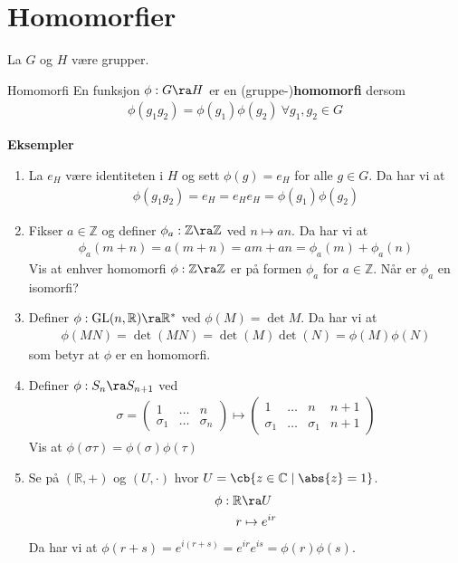 \section{Homomorfier}
La $G$ og $H$ være grupper.

\begin{definition}{Homomorfi}{}
	En funksjon $\phi:G\ra H$ er en (gruppe-)\textbf{homomorfi} dersom
	\begin{align}
		\phi(g_1g_2)=\phi(g_1)\phi(g_2)\ \forall g_1,g_2\in G
	\end{align}
\end{definition}

\textbf{Eksempler}
\begin{enumerate}
	\item La $e_H$ være identiteten i $H$ og sett $\phi(g)=e_H$ for alle $g\in G$. Da har vi at
	      \begin{align}
		      \phi(g_1g_2)=e_H=e_He_H=\phi(g_1)\phi(g_2)
	      \end{align}
	\item Fikser $a\in \mathbb{Z}$ og definer $\phi_a: \mathbb{Z}\ra \mathbb{Z}$ ved
	      $n \mapsto an$. Da har vi at
	      \begin{align}
		      \phi_a(m+n)=a(m+n)=am+an=\phi_a(m)+\phi_a(n)
	      \end{align}
	      Vis at enhver homomorfi $\phi: \mathbb{Z}\ra \mathbb{Z}$ er på formen $\phi_a$ for
	      $a\in \mathbb{Z}$. Når er $\phi_a$ en isomorfi?
	\item Definer $\phi: \text{GL}(n,\mathbb{R})\ra \mathbb{R}^*$ ved $\phi(M)=\det M$. Da har
	      vi at
	      \begin{align}
		      \phi(MN)=\det(MN)=\det(M)\det(N)=\phi(M)\phi(N)
	      \end{align}
	      som betyr at $\phi$ er en homomorfi.
	\item Definer $\phi:S_n\ra S_{n+1}$ ved
	      \begin{align}
		      \sigma=\begin{pmatrix}1 & \dots & n \\ \sigma_1 & \dots & \sigma_n\end{pmatrix}
		      \mapsto
		      \begin{pmatrix}1 & \dots & n & n+1 \\ \sigma_1 & \dots & \sigma_1 & n+1\end{pmatrix}
	      \end{align}
	      Vis at $\phi(\sigma\tau)=\phi(\sigma)\phi(\tau)$
	\item Se på $(\mathbb{R}, +)$ og $(U, \cdot)$ hvor $U=\cb{z\in\mathbb{C}\mid\abs{z}=1}$.
	      \begin{align}
		      \phi: \mathbb{R} & \ra U          \\
		      r                & \mapsto e^{ir}
	      \end{align}
	      Da har vi at $\phi(r+s)=e^{i(r+s)}=e^{ir}e^{is}=\phi(r)\phi(s)$.
\end{enumerate}


